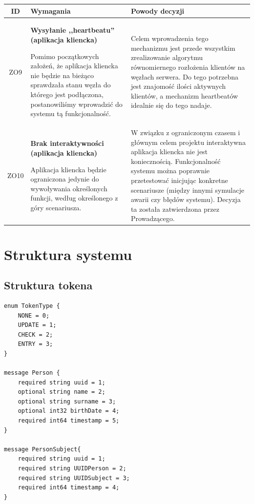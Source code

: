{\begin{tabularx}{\textwidth}{|c|X|X|}
\end{tabularx}

\pagebreak

\begin{tabularx}{\textwidth}{|c|X|X|}
\hline
\textbf{ID} & \textbf{Wymagania}  & \textbf{Powody decyzji} \\
\hline
\label{z:ZO9} ZO9 &  \textbf{Wysyłanie ,,heartbeatu'' (aplikacja kliencka)}

Pomimo początkowych założeń, że aplikacja kliencka nie będzie na bieżąco sprawdzała stanu węzła do którego jest podłączona, postanowiliśmy wprowadzić do systemu tą funkcjonalność.  & 
Celem wprowadzenia tego mechanizmu jest przede wszystkim zrealizowanie algorytmu równomiernego rozłożenia klientów na węzłach serwera. Do tego potrzebna jest znajomość ilości aktywnych klientów, a mechanizm heartbeatów idealnie się do tego nadaje.\\
\hline

\label{z:ZO10} ZO10 &  \textbf{Brak interaktywności (aplikacja kliencka)}

Aplikacja kliencka będzie ograniczona jedynie do wywoływania określonych funkcji, według określonego z góry scenariusza. & 
W związku z ograniczonym czasem i głównym celem projektu interaktywna aplikacja kliencka nie jest koniecznością. Funkcjonalność systemu można poprawnie przetestować inicjując konkretne scenariusze (między innymi symulacje awarii czy błędów systemu). Decyzja ta została zatwierdzona przez Prowadzącego.\\
\hline

\end{tabularx}

\section[Struktura systemu]{Struktura systemu}

\subsection{Struktura tokena}
\begin{lstlisting}
enum TokenType {
    NONE = 0;
    UPDATE = 1;
    CHECK = 2;
    ENTRY = 3;
}

message Person {
    required string uuid = 1;
    optional string name = 2;
    optional string surname = 3;
    optional int32 birthDate = 4;
    required int64 timestamp = 5;
}

message PersonSubject{
    required string uuid = 1;
    required string UUIDPerson = 2;
    required string UUIDSubject = 3;
    required int64 timestamp = 4;
}


\end{lstlisting}}

